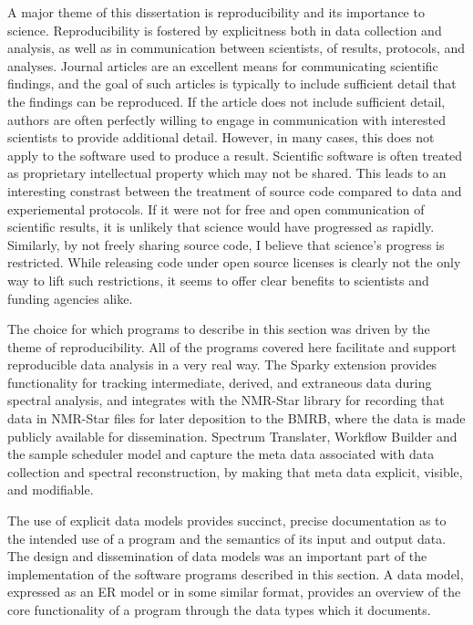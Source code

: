 A major theme of this dissertation is reproducibility and its importance to
science.  Reproducibility is fostered by explicitness both in data collection
and analysis, as well as in communication between scientists, of results, 
protocols, and analyses.  Journal articles are an excellent means for 
communicating scientific findings, and the goal of such articles is typically
to include sufficient detail that the findings can be reproduced.  If the
article does not include sufficient detail, authors are often perfectly willing
to engage in communication with interested scientists to provide additional
detail.  However, in many cases, this does not apply to the software used to
produce a result.  Scientific software is often treated as proprietary 
intellectual property which may not be shared.  This leads to an interesting
constrast between the treatment of source code compared to data and experiemental
protocols.  If it were not for free and open communication of scientific results,
it is unlikely that science would have progressed as rapidly.  Similarly, by not
freely sharing source code, I believe that science's progress is restricted. 
While releasing code under open source licenses is clearly not the only way to
lift such restrictions, it seems to offer clear benefits to scientists and
funding agencies alike.

The choice for which programs to describe in this section was driven by the
theme of reproducibility.  All of the programs covered here facilitate and 
support reproducible data analysis in a very real way.  The Sparky extension
provides functionality for tracking intermediate, derived, and extraneous data
during spectral analysis, and integrates with the NMR-Star library for recording
that data in NMR-Star files for later deposition to the BMRB, where the data is
made publicly available for dissemination.  Spectrum Translater, Workflow Builder
and the sample scheduler model and capture the meta data associated with 
data collection and spectral reconstruction, by making that meta data explicit,
visible, and modifiable.

The use of explicit data models provides succinct, precise documentation as to
the intended use of a program and the semantics of its input and output data.
The design and dissemination of data models was an important part of the
implementation of the software programs described in this section.  A data 
model, expressed as an ER model or in some similar format, provides an
overview of the core functionality of a program through the data types 
which it documents.

